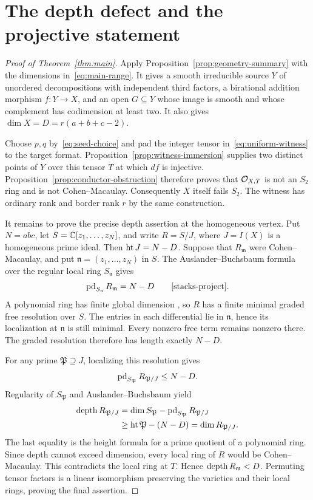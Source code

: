 \section{The depth defect and the projective statement}\label{sec:main-proof}

\begin{proof}[Proof of Theorem~\ref{thm:main}]
Apply Proposition~\ref{prop:geometry-summary} with the dimensions
in~\eqref{eq:main-range}. It gives a smooth irreducible source $Y$
of unordered decompositions with independent third factors, a
birational addition morphism $f:Y\to X$, and an open
$G\subseteq Y$ whose image is smooth and whose complement has
codimension at least two. It also gives
$\dim X=D=r(a+b+c-2)$.

Choose $p,q$ by~\eqref{eq:seed-choice} and pad the integer tensor
in~\eqref{eq:uniform-witness} to the target format.
Proposition~\ref{prop:witness-immersion} supplies two distinct
points of $Y$ over this tensor $T$ at which $df$ is injective.
Proposition~\ref{prop:conductor-obstruction} therefore proves that
$\mathcal O_{X,T}$ is not an $S_2$ ring and is not Cohen--Macaulay.
Consequently $X$ itself fails $S_2$. The witness has ordinary rank
and border rank $r$ by the same construction.

It remains to prove the precise depth assertion at the homogeneous
vertex. Put $N=abc$, let $S=\mathbb C[z_1,\ldots,z_N]$, and write
$R=S/J$, where $J=I(X)$ is a homogeneous prime ideal. Then
$\operatorname{ht} J=N-D$. Suppose that $R_{\mathfrak m}$ were
Cohen--Macaulay, and put $\mathfrak n=(z_1,\ldots,z_N)$ in $S$.
The Auslander--Buchsbaum formula over the regular local ring
$S_{\mathfrak n}$ gives
\[
 \pd_{S_{\mathfrak n}}R_{\mathfrak m}=N-D
 \qquad\text{\cite[Tag~090V]{stacks-project}}.
\]
A polynomial ring has finite global dimension
\cite[Tag~00OQ]{stacks-project}, so $R$ has a finite minimal graded
free resolution over $S$. The entries in each differential lie in
$\mathfrak n$, hence its localization at $\mathfrak n$ is still
minimal. Every nonzero free term remains nonzero there. The graded
resolution therefore has length exactly $N-D$.

For any prime $\mathfrak P\supseteq J$, localizing this resolution
gives
\[
 \operatorname{pd}_{S_{\mathfrak P}}R_{\mathfrak P/J}\leq N-D.
\]
Regularity of $S_{\mathfrak P}$ and Auslander--Buchsbaum yield
\begin{align*}
 \operatorname{depth} R_{\mathfrak P/J}
 &=\dim S_{\mathfrak P}
      -\operatorname{pd}_{S_{\mathfrak P}}R_{\mathfrak P/J}\\
 &\geq\operatorname{ht}\mathfrak P-(N-D)
   =\dim R_{\mathfrak P/J}.
\end{align*}
The last equality is the height formula for a prime quotient of a
polynomial ring. Since depth cannot exceed dimension, every local
ring of $R$ would be Cohen--Macaulay. This contradicts the local ring
at $T$. Hence $\operatorname{depth} R_{\mathfrak m}<D$. Permuting tensor factors
is a linear isomorphism preserving the varieties and their local
rings, proving the final assertion.
\end{proof}

